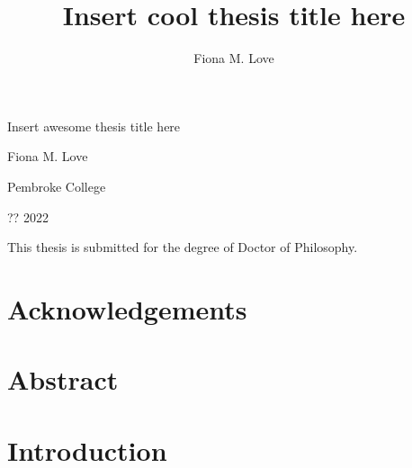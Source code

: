 \documentclass[
  12pt,
  a4paper,
]{book}
\title{Insert cool thesis title here}
\author{Fiona M. Love}
\date{}
\begin{document}
\maketitle

\begin{titlepage}
\begin{center}

  \hspace{0pt}
  \vfill
  
  {\Huge
  Insert awesome thesis title here
  }\par
  
  {\Large
  Fiona M. Love
  }\par
  
   \vspace{1\baselineskip}
  
  {Pembroke College}\par
  {?? 2022}\par
  
  \vspace{4\baselineskip}
  
  {This thesis is submitted for the degree of Doctor of Philosophy.}\par
  
  \vfill
  \hspace{0pt}

\end{center}
\end{titlepage}

\hypertarget{ACKNOWLEDGEMENTS}{%
\chapter*{Acknowledgements}\label{ACKNOWLEDGEMENTS}}


\hypertarget{ABSTRACT}{%
\chapter*{Abstract}\label{ABSTRACT}}



\tableofcontents

\hypertarget{INTRODUCTION}{%
\chapter*{Introduction}\label{INTRODUCTION}}
\end{document}
